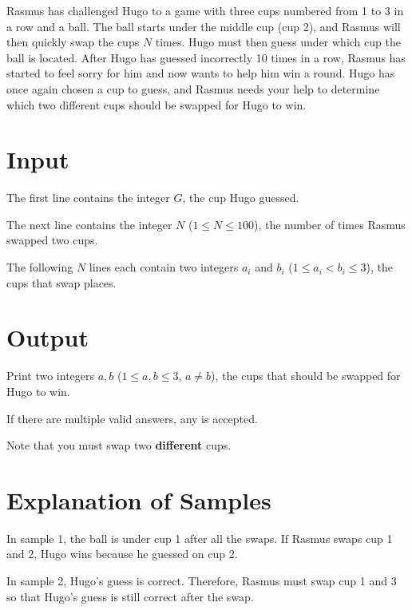 
Rasmus has challenged Hugo to a game with three cups numbered from 1 to 3 in a row and a ball.
The ball starts under the middle cup (cup 2), and Rasmus will then quickly swap the cups $N$ times.
Hugo must then guess under which cup the ball is located. After Hugo has guessed incorrectly 10 times
in a row, Rasmus has started to feel sorry for him and now wants to help him win a round. Hugo has
once again chosen a cup to guess, and Rasmus needs your help to determine which two different cups
should be swapped for Hugo to win.

\section*{Input}
The first line contains the integer $G$, the cup Hugo guessed.

The next line contains the integer $N$ ($1 \le N \le 100$), the number of times Rasmus swapped two cups.

The following $N$ lines each contain two integers $a_i$ and $b_i$ ($1 \le a_i < b_i \le 3$), the cups that swap places.

\section*{Output}
Print two integers $a,b$ ($1 \leq a,b \leq 3$, $a \neq b$), the cups that should be swapped for Hugo to win.

If there are multiple valid answers, any is accepted.

Note that you must swap two \textbf{different} cups.

\section*{Explanation of Samples}
In sample 1, the ball is under cup 1 after all the swaps. If Rasmus swaps cup 1 and 2, Hugo wins because he guessed on cup 2.

In sample 2, Hugo's guess is correct. Therefore, Rasmus must swap cup 1 and 3 so that Hugo's guess is still correct after the swap.
